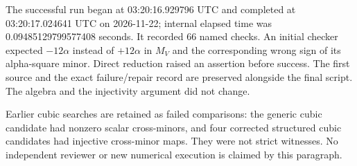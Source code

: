 The successful run began at 03:20:16.929796 UTC and completed at
03:20:17.024641 UTC on 2026-11-22; internal elapsed time was
0.09485129799577408 seconds. It recorded 66 named checks. An initial
checker expected \(-12\alpha\) instead of \(+12\alpha\) in \(M_V\) and the
corresponding wrong sign of its alpha-square minor. Direct reduction
raised an assertion before success. The first source and the exact
failure/repair record are preserved alongside the final script.
The algebra and the injectivity argument did not change.

Earlier cubic searches are retained as failed comparisons: the
generic cubic candidate had nonzero scalar cross-minors, and four
corrected structured cubic candidates had injective cross-minor
maps. They were not strict witnesses. No independent reviewer or
new numerical execution is claimed by this paragraph.
